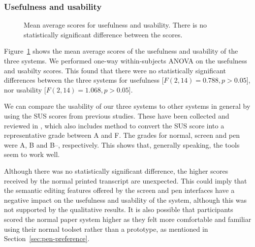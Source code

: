 \subsubsection{Usefulness and usability}

\begin{figure}[p]
  \centering
  \caption{Mean average scores for usefulness and usability. There is no statistically significant difference between
  the scores.}
  \label{fig:pen-useful-usable}
\end{figure}

Figure~\ref{fig:pen-useful-usable} shows the mean average scores of the usefulness and usability of the three systems.  We
performed one-way within-subjects ANOVA on the usefulness and usabilty scores. This found that there were no
statistically significant differences between the three systems for usefulness [$F(2,14)=0.788, p>0.05$], nor usability
[$F(2,14)=1.068, p>0.05$].

We can compare the usability of our three systems to other systems in general by using the SUS scores from 
previous studies. These have been collected and reviewed in \citet{Sauro2016}, which also includes method to convert
the SUS score into a representative grade between A and F.  The grades for normal, screen and pen were A, B and B--,
respectively. This shows that, generally speaking, the tools seem to work well.

Although there was no statistically significant difference, the higher scores received by the normal printed transcript
are unexpected. This could imply that the semantic editing features offered by the screen and pen interfaces have a
negative impact on the usefulness and usability of the system, although this was not supported by the qualitative
results. It is also possible that participants scored the normal paper system higher as they felt more
comfortable and familiar using their normal toolset rather than a prototype, as mentioned in
Section~\ref{sec:pen-preference}.

